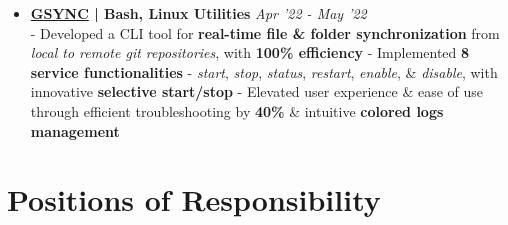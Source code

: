 \documentclass[a4paper,10pt]{extarticle} %
\begin{document}
\begin{itemize}[leftmargin=0.55cm, rightmargin=0.2cm, label={\Large\textbullet}]
\item \textbf{\href{https://github.com/proffapt/gsync}{GSYNC} | Bash, Linux Utilities} \hfill{\textit{Apr '22 - May '22}} \\
- Developed a CLI tool for \textbf{real-time file \& folder synchronization} from \textit{local to remote git repositories}, with \textbf{100\% efficiency} \newline
- Implemented \textbf{8 service functionalities} - \textit{start}, \textit{stop}, \textit{status}, \textit{restart}, \textit{enable}, \& \textit{disable}, with innovative \textbf{selective start/stop} \newline
- Elevated user experience \& ease of use through efficient troubleshooting by \textbf{40\%} \& intuitive \textbf{colored logs management}

\end{itemize}


\vspace{0.2cm}
\section{\textcolor{primary}{Positions of Responsibility}}
\vspace{+0.2cm}
\end{document}
